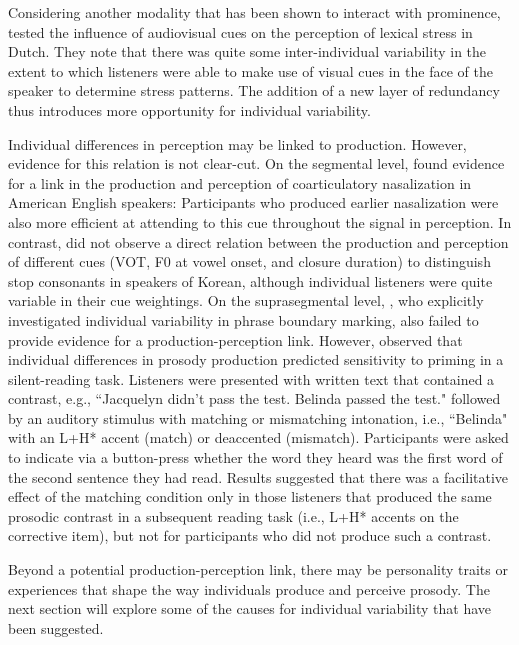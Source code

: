 Considering another modality that has been shown to interact with prominence, \citet{bujokAudiovisualPerceptionLexical2024} tested the influence of audiovisual cues on the perception of lexical stress in Dutch. They note that there was quite some inter-individual variability in the extent to which listeners were able to make use of visual cues in the face of the speaker to determine stress patterns. The addition of a new layer of redundancy thus introduces more opportunity for individual variability.

Individual differences in perception may be linked to production. However, evidence for this relation is not clear-cut. On the segmental level, \citet{beddorTimeCourseIndividuals2018} found evidence for a link in the production and perception of coarticulatory nasalization in American English speakers: Participants who produced earlier nasalization were also more efficient at attending to this cue throughout the signal in perception. In contrast, \citet{schertzIndividualDifferencesPhonetic2015} did not observe a direct relation between the production and perception of different cues (VOT, F0 at vowel onset, and closure duration) to distinguish stop consonants in speakers of Korean, although individual listeners were quite variable in their cue weightings. On the suprasegmental level, \citet{kimIndividualDifferencesProduction2020}, who explicitly investigated individual variability in phrase boundary marking, also failed to provide evidence for a production-perception link. However, \citet{speerImplicitProsodyCorrective2015} observed that individual differences in prosody production predicted sensitivity to priming in a silent-reading task. Listeners were presented with written text that contained a contrast, e.g., ``Jacquelyn didn’t pass the test. Belinda passed the test." followed by an auditory stimulus with matching or mismatching intonation, i.e., ``Belinda" with an L+H* accent (match) or deaccented (mismatch). Participants were asked to indicate via a button-press whether the word they heard was the first word of the second sentence they had read. Results suggested that there was a facilitative effect of the matching condition only in those listeners that produced the same prosodic contrast in a subsequent reading task (i.e., L+H* accents on the corrective item), but not for participants who did not produce such a contrast. 

Beyond a potential production-perception link, there may be personality traits or experiences that shape the way individuals produce and perceive prosody. The next section will explore some of the causes for individual variability that have been suggested.

